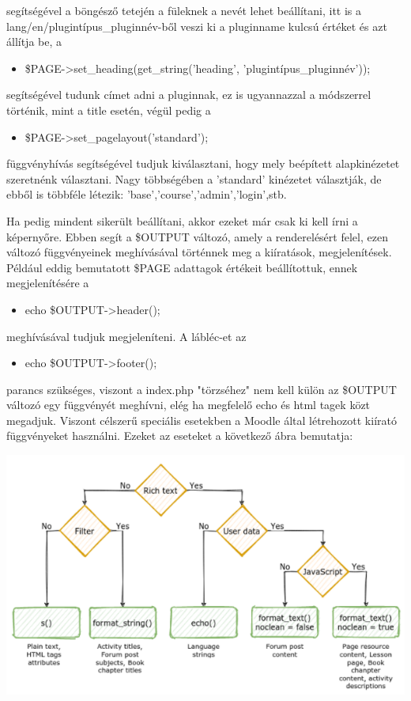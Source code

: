 segítségével a böngésző tetején a füleknek a nevét lehet beállítani, itt is a \break lang/en/plugintípus\_pluginnév-ből veszi ki a pluginname kulcsú értéket és azt állítja be, a 
\begin{itemize}
    \item[] \$PAGE->set\_heading(get\_string('heading', 'plugintípus\_pluginnév'));
\end{itemize}
segítségével tudunk címet adni a pluginnak, ez is ugyannazzal a módszerrel történik, mint a title esetén, végül pedig a
\begin{itemize}
    \item[] \$PAGE->set\_pagelayout('standard');
\end{itemize}
függvényhívás segítségével tudjuk kiválasztani, hogy mely beépített alapkinézetet szeretnénk választani. Nagy többségében a 'standard' kinézetet választják, de ebből is többféle létezik: 'base','course','admin','login',stb. \par

Ha pedig mindent sikerült beállítani, akkor ezeket már csak ki kell írni a képernyőre. Ebben segít a \$OUTPUT változó, amely a renderelésért felel, ezen változó függvényeinek meghívásával történnek meg a kiíratások, megjelenítések. Például eddig bemutatott \$PAGE adattagok értékeit beállítottuk, ennek megjelenítésére a 
\begin{itemize}
    \item[] echo \$OUTPUT->header();
\end{itemize}
meghívásával tudjuk megjeleníteni. A lábléc-et az
\begin{itemize}
    \item[] echo \$OUTPUT->footer();
\end{itemize}
parancs szükséges, viszont a index.php "törzséhez" nem kell külön az \$OUTPUT változó egy függvényét meghívni, elég ha megfelelő echo és html tagek közt megadjuk. Viszont célszerű speciális esetekben a Moodle által létrehozott kiírató függvényeket használni. Ezeket az eseteket a következő ábra bemutatja:

\begin{center}
    \includegraphics[scale=0.9]{Fejezetek/Images/print.png}
\end{center}

